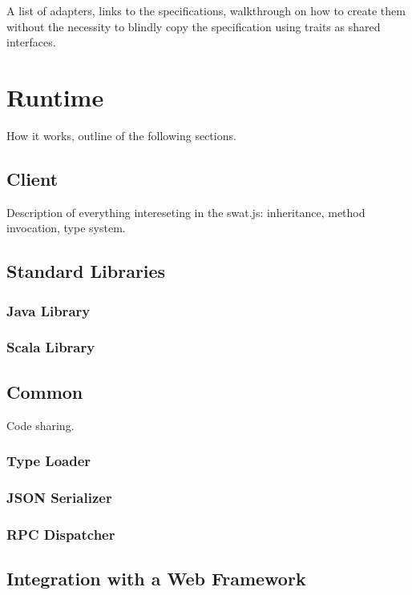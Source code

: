 \documentclass[12pt,a4paper]{report}
\begin{document}
A list of adapters, links to the specifications, walkthrough on how to create them without the necessity to blindly copy the specification using traits as shared interfaces.



\chapter{Runtime}

How it works, outline of the following sections.

\section{Client}

Description of everything intereseting in the swat.js: inheritance, method invocation, type system.

\section{Standard Libraries}

\subsection{Java Library}

\subsection{Scala Library}

\section{Common}

Code sharing.

\subsection{Type Loader}

\subsection{JSON Serializer}

\subsection{RPC Dispatcher}

\section{Integration with a Web Framework}
\end{document}
